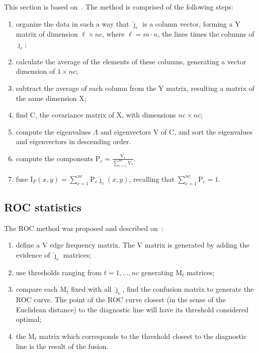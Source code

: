 \documentclass[journal]{IEEEtran}
\begin{document}
This section is based on~\cite{n_r,mit}.
The method is comprised of the following steps:
\begin{enumerate}
\item organize the data in such a way that $\bm{\widehat\jmath}_c$ is a column vector, forming a Y matrix of dimension $\ell\times nc$, where $\ell=m\cdot n$, the lines times the columns of $\bm{\widehat\jmath}_c$;
\item calculate the average of the elements of these columns, generating a vector dimension of $1\times nc$;
\item subtract the average of each column from the Y matrix, resulting a matrix of the same dimension X; 
\item find C, the covariance matrix of X, with dimensions $nc\times nc$;
\item compute the eigenvalues $\Lambda$ and eigenvectors V of C, and sort the eigenvalues and eigenvectors in descending order. %
\item compute the components $\text{P}_c=\frac{\text{V}_c}{\sum_{c=1}^{nc} \text{V}_c}$. %
\item fuse $\text{I}_F(x,y)=\sum_{c=1}^{nc}\text{P}_c\bm{\widehat\jmath}_c(x,y)$, recalling that $\sum_{c=1}^{nc}\text{P}_c=1$.
\end{enumerate}

\subsection{ROC statistics}

The ROC method was proposed and described on~\cite{gs,fawcett}:
\begin{enumerate}
\item define a V edge frequency matrix. The V matrix is generated by adding the evidence of $\bm{\widehat\jmath}_c$ matrices;
\item use thresholds ranging from $t=1,\dots,nc$ generating $\text{M}_t$ matrices;
\item compare each $\text{M}_t$ fixed with all $\bm{\widehat\jmath}_c$, find the confusion matrix to generate the ROC curve. The point of the ROC curve closest (in the sense of the Euclidean distance) to the diagnostic line will have its threshold considered optimal;
\item the $\text{M}_t$ matrix which corresponds to the threshold closest to the diagnostic line is the result of the fusion.
\end{enumerate}
\end{document}
